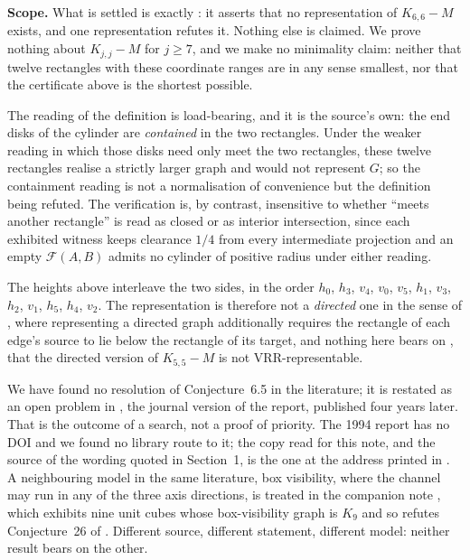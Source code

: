 \documentclass[11pt]{amsart}
\begin{document}
\medskip
\noindent
\textbf{Scope.}
What is settled is exactly \cite[Conjecture~6.5]{BoseEtAl1994}: it asserts that
no representation of $K_{6,6}-M$ exists, and one representation refutes it.
Nothing else is claimed.  We prove nothing about $K_{j,j}-M$ for $j\ge7$, and we
make no minimality claim: neither that twelve rectangles with these coordinate
ranges are in any sense smallest, nor that the certificate above is the
shortest possible.

The reading of the definition is load-bearing, and it is the source's own: the
end disks of the cylinder are \emph{contained} in the two rectangles.  Under
the weaker reading in which those disks need only meet the two rectangles,
these twelve rectangles realise a strictly larger graph and would not represent
$G$; so the containment reading is not a normalisation of convenience but the
definition being refuted.  The verification is, by contrast, insensitive to
whether ``meets another rectangle'' is read as closed or as interior
intersection, since each exhibited witness keeps clearance $1/4$ from every
intermediate projection and an empty $\mathcal F(A,B)$ admits no cylinder of
positive radius under either reading.

The heights above interleave the two sides, in the order
$h_0$, $h_3$, $v_4$, $v_0$, $v_5$, $h_1$, $v_3$, $h_2$, $v_1$, $h_5$, $h_4$,
$v_2$.  The representation is
therefore not a \emph{directed} one in the sense of
\cite[Sec.~6]{BoseEtAl1994}, where representing a directed graph additionally
requires the rectangle of each edge's source to lie below the rectangle of its
target, and nothing here bears on \cite[Theorem~6.4]{BoseEtAl1994}, that the
directed version of $K_{5,5}-M$ is not VRR-representable.

We have found no resolution of Conjecture~6.5 in the literature; it is restated
as an open problem in \cite[Sec.~5]{BoseEtAl1998}, the journal version of the
report, published four years later.  That is the outcome of a search, not a
proof of priority.  The 1994 report has no DOI and we found no library route to
it; the copy read for this note, and the source of the wording quoted in
Section~1, is the one at the address printed in \cite{BoseEtAl1994}.  A
neighbouring model in the same literature, box visibility, where the channel
may run in any of the three axis directions, is treated in the companion note
\cite{CompanionCubes}, which exhibits nine unit cubes whose box-visibility
graph is $K_9$ and so refutes Conjecture~26 of \cite{FeketeMeijer1999}.
Different source, different statement, different model: neither result bears on
the other.
\end{document}
